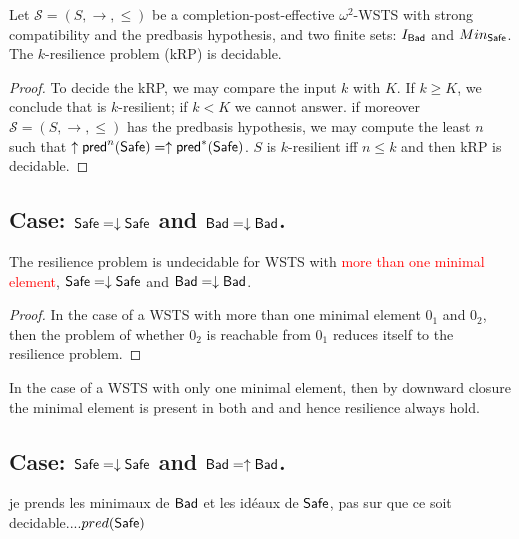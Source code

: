 \begin{theorem}\label{k-down-up}
Let $\mathscr{S}=(S,\rightarrow, \leq)$ be a completion-post-effective $\omega^2$-WSTS with strong compatibility and the predbasis hypothesis, and two finite sets: $I_{\textsf{Bad}}$ and $Min_{\textsf{Safe}}$.
The  $k$-resilience problem (kRP) is decidable.
 \end{theorem}

\begin{proof}
To decide the kRP, we may compare the input $k$ with $K$. If $k \geq K$, we conclude that is %
$k$-resilient; if $k < K$ we cannot answer. if moreover $\mathscr{S}=(S,\rightarrow, \leq)$ has the predbasis hypothesis, we may compute the least $n$ such that $ \uparrow \textsf{pred}^n(\textsf{Safe})=  \uparrow \textsf{pred}^*(\textsf{Safe})$. $S$ is %
 $k$-resilient iff $n \leq k$ and then kRP is decidable.
\end{proof}

%




\subsection{Case: $\textsf{Safe}=\downarrow \textsf{Safe}$ and $\textsf{Bad}=\downarrow \textsf{Bad}$.}


\begin{theorem}\label{down-down}
The resilience problem is undecidable for WSTS with \textcolor{red}{more than one minimal element}, $\textsf{Safe}=\downarrow \textsf{Safe}$
and $\textsf{Bad}=\downarrow \textsf{Bad}$.
\end{theorem}

\begin{proof}
In the case of a WSTS with more than one minimal element $0_1$ and $0_2$, then the problem of whether $0_2$ is reachable from $0_1$ reduces itself to the resilience problem.  
\end{proof}

In the case of a WSTS with only one minimal element,  
then by downward closure the minimal element is present in both \Safe and \Bad and hence resilience always hold.


\subsection{Case: $\textsf{Safe}=\downarrow \textsf{Safe}$ and $\textsf{Bad}=\uparrow \textsf{Bad}$.}
%
%
je prends les minimaux de $\textsf{Bad}$ et les idéaux de $\textsf{Safe}$, pas sur que ce soit decidable....$pred(\textsf{Safe})$


